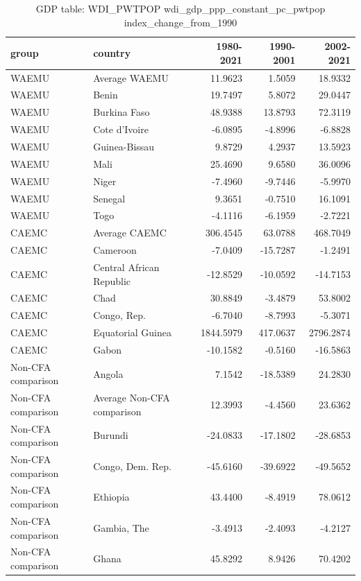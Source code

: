\begin{table}

\caption{GDP table: WDI_PWTPOP wdi_gdp_ppp_constant_pc_pwtpop index_change_from_1990}
\centering
\begin{tabular}[t]{llrrr}
\toprule
group & country & 1980-2021 & 1990-2001 & 2002-2021\\
\midrule
WAEMU & Average WAEMU & 11.9623 & 1.5059 & 18.9332\\
WAEMU & Benin & 19.7497 & 5.8072 & 29.0447\\
WAEMU & Burkina Faso & 48.9388 & 13.8793 & 72.3119\\
WAEMU & Cote d'Ivoire & -6.0895 & -4.8996 & -6.8828\\
WAEMU & Guinea-Bissau & 9.8729 & 4.2937 & 13.5923\\
\addlinespace
WAEMU & Mali & 25.4690 & 9.6580 & 36.0096\\
WAEMU & Niger & -7.4960 & -9.7446 & -5.9970\\
WAEMU & Senegal & 9.3651 & -0.7510 & 16.1091\\
WAEMU & Togo & -4.1116 & -6.1959 & -2.7221\\
CAEMC & Average CAEMC & 306.4545 & 63.0788 & 468.7049\\
\addlinespace
CAEMC & Cameroon & -7.0409 & -15.7287 & -1.2491\\
CAEMC & Central African Republic & -12.8529 & -10.0592 & -14.7153\\
CAEMC & Chad & 30.8849 & -3.4879 & 53.8002\\
CAEMC & Congo, Rep. & -6.7040 & -8.7993 & -5.3071\\
CAEMC & Equatorial Guinea & 1844.5979 & 417.0637 & 2796.2874\\
\addlinespace
CAEMC & Gabon & -10.1582 & -0.5160 & -16.5863\\
Non-CFA comparison & Angola & 7.1542 & -18.5389 & 24.2830\\
Non-CFA comparison & Average Non-CFA comparison & 12.3993 & -4.4560 & 23.6362\\
Non-CFA comparison & Burundi & -24.0833 & -17.1802 & -28.6853\\
Non-CFA comparison & Congo, Dem. Rep. & -45.6160 & -39.6922 & -49.5652\\
\addlinespace
Non-CFA comparison & Ethiopia & 43.4400 & -8.4919 & 78.0612\\
Non-CFA comparison & Gambia, The & -3.4913 & -2.4093 & -4.2127\\
Non-CFA comparison & Ghana & 45.8292 & 8.9426 & 70.4202\\

\end{tabular}
\end{table}
